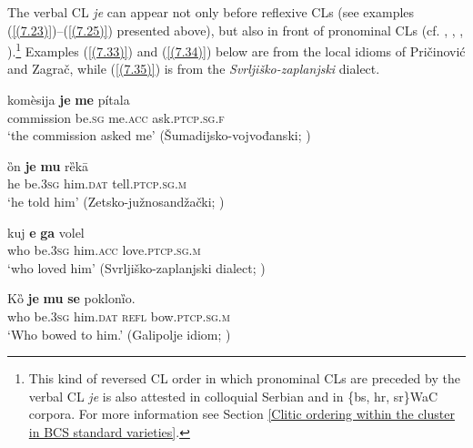 
\noindent The verbal CL \textit{je} can appear not only before reflexive CLs (see examples (\ref{(7.23)})--(\ref{(7.25)}) presented above), but also in front of pronominal CLs (cf. \citealt[394]{Ivic57}, \citealt[210]{Pesikan65}, \citealt[279]{Nikolic66}, \citealt[256]{Okuka08}).\footnote{This kind of reversed CL order in which pronominal CLs are preceded by the verbal CL \textit{je} is also attested in colloquial Serbian and in \{bs, hr, sr\}WaC corpora. For more information see Section \ref{Clitic ordering within the cluster in BCS standard varieties}.} Examples (\ref{(7.33)}) and (\ref{(7.34)}) below are from the local idioms of Pričinović and Zagrač, while (\ref{(7.35)}) is from the \textit{Svrljiško-zaplanjski} dialect. 

\begin{exe}\ex\label{(7.33)}
\gll komèsija  \textbf{je}  \textbf{me}  pítala  \\
commission be.\textsc{sg}  me.\textsc{acc}  ask.\textsc{ptcp.sg.f} \\
\glt ‘the commission asked me’
\hfill  (Šumadijsko-vojvođanski; \citealt[279]{Nikolic66})

\ex\label{(7.34)}
\gll ȍn  \textbf{je}  \textbf{mu}  rȅkā  \\
he be.3\textsc{sg}  him.\textsc{dat}  tell.\textsc{ptcp.sg.m} \\
\glt ‘he told him’
\hfill  (Zetsko-južnosandžački; \citealt[210]{Pesikan65})

\ex\label{(7.35)}
\gll kuj  \textbf{e}  \textbf{ga}  volel  \\
who be.3\textsc{sg}  him.\textsc{acc}  love.\textsc{ptcp.sg.m}\\
\glt ‘who loved him’
\hfill  (Svrljiško-zaplanjski dialect; \citealt[256]{Okuka08})

\ex\label{(7.36)}
\gll Kȍ  \textbf{je}  \textbf{mu}  \textbf{se}  poklonȉo. \\
who be.3\textsc{sg}  him.\textsc{dat} \textsc{refl}  bow.\textsc{ptcp.sg.m} \\
\glt ‘Who bowed to him.’
\hfill  (Galipolje idiom; \citealt[394]{Ivic57})
\end{exe}


